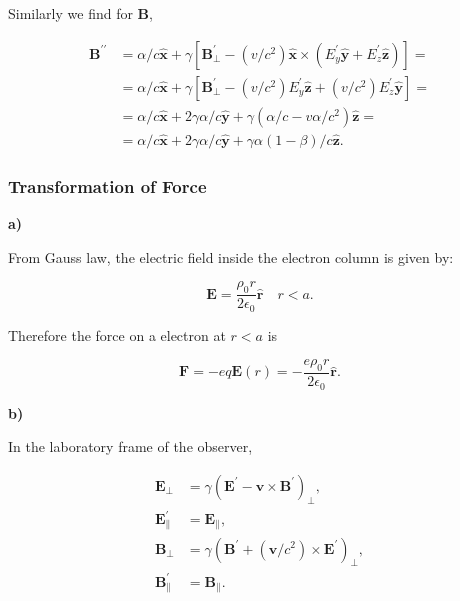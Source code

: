 Similarly we find for $\mathbf{B}$,

\begin{equation}
	\begin{split}
		\mathbf{B}^{\prime \prime}&=\alpha / c \hat{\mathbf{x}}+\gamma\left[\mathbf{B}_{\perp}^{\prime}-\left(v / c^{2}\right) \hat{\mathbf{x}} \times\left(E_{y}^{\prime} \hat{\mathbf{y}}+E_{z}^{\prime} \hat{\mathbf{z}}\right)\right]=\\
		&=\alpha / c \hat{\mathbf{x}}+\gamma\left[\mathbf{B}_{\perp}^{\prime}-\left(v / c^{2}\right) E_{y}^{\prime} \hat{\mathbf{z}}+\left(v / c^{2}\right) E_{z}^{\prime} \hat{\mathbf{y}}\right]=\\
		&=\alpha / c \hat{\mathbf{x}}+2 \gamma \alpha / c \hat{\mathbf{y}}+\gamma\left(\alpha / c-v \alpha / c^{2}\right) \hat{\mathbf{z}}=\\
		&=\alpha / c \hat{\mathbf{x}}+2 \gamma \alpha / c \hat{\mathbf{y}}+\gamma \alpha(1-\beta) / c \hat{\mathbf{z}}.
	\end{split}
\end{equation}
	
\subsubsection{Transformation of Force}\label{Transformation of Force}

\textbf{a)}
	
From Gauss law, the electric field inside the electron column is given by:

\begin{equation}
	\mathbf{E}=\frac{\rho_{0} r}{2 \epsilon_{0}} \hat{\mathbf{r}} \quad r<a.
\end{equation}

Therefore the force on a electron at $r<a$ is

\begin{equation}
	\mathbf{F}=-e q \mathbf{E}(r)=-\frac{e \rho_{0} r}{2 \epsilon_{0}} \hat{\mathbf{r}}.
\end{equation}

\textbf{b)}

In the laboratory frame of the observer,

\begin{equation}\begin{split}
		\mathbf{E}_{\perp}&=\gamma\left(\mathbf{E}^{\prime}-\mathbf{v} \times \mathbf{B}^{\prime}\right)_{\perp},\\ \mathbf{E}_{\|}^{\prime}&=\mathbf{E}_{\|}, \\
		\mathbf{B}_{\perp}&=\gamma\left(\mathbf{B}^{\prime}+\left(\mathbf{v} / c^{2}\right) \times \mathbf{E}^{\prime}\right)_{\perp},\\
		\mathbf{B}_{\|}^{\prime}&=\mathbf{B}_{\|} .
	\end{split}
\end{equation}


